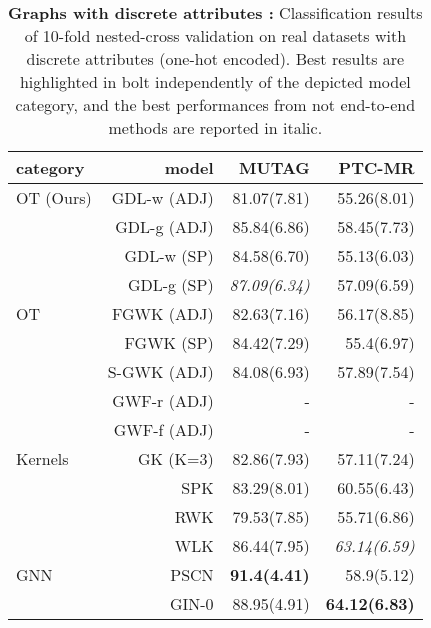 \documentclass{article}
\begin{document}
	\begin{table}[!h]
		\centering
		\caption{\textbf{Graphs with discrete attributes :} Classification results of 10-fold nested-cross validation on real datasets with discrete attributes (one-hot encoded). Best results are highlighted in bolt independently of the depicted model category, and the best performances from not end-to-end methods are reported in italic.}
		\label{tab:res2}
		\scalebox{0.81}
		{\begin{tabular}{|l|r|r|r|}
				\hline
				category & model & MUTAG &PTC-MR \\ \hline
				OT (Ours) & GDL-w (ADJ) & 81.07(7.81) & 55.26(8.01)\\
				& GDL-g (ADJ) & 85.84(6.86) & 58.45(7.73)\\
				& GDL-w (SP)  & 84.58(6.70)& 55.13(6.03)\\
				& GDL-g (SP)  & \textit{87.09(6.34)}& 57.09(6.59)\\ \hline
				OT & FGWK (ADJ)  & 82.63(7.16)& 56.17(8.85) \\  
				& FGWK (SP)  & 84.42(7.29)& 55.4(6.97)\\
				& S-GWK (ADJ)  & 84.08(6.93)& 57.89(7.54)\\
				& GWF-r (ADJ)  & -& -\\
				& GWF-f (ADJ)  & -& -\\ \hline
				Kernels & GK (K=3)  & 82.86(7.93)& 57.11(7.24) \\
				& SPK &  83.29(8.01)&  60.55(6.43)\\
				& RWK & 79.53(7.85)& 55.71(6.86)\\
				& WLK & 86.44(7.95)& \textit{63.14(6.59)}\\ \hline
				GNN & PSCN & \textbf{91.4(4.41)} & 58.9(5.12)\\
				& GIN-0  & 88.95(4.91)& \textbf{64.12(6.83)}\\ \hline
		\end{tabular}}
	\end{table}
	\vspace{-5mm}
\end{document}
